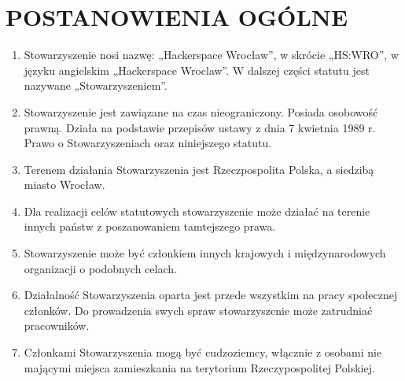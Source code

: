 \documentclass{article}
\begin{document}
\section{POSTANOWIENIA OGÓLNE}
  \begin{enumerate}
    \item Stowarzyszenie nosi nazwę: „Hackerspace Wrocław”, w skrócie „HS:WRO”, w języku angielskim „Hackerspace Wroclaw”. W dalszej części statutu jest nazywane „Stowarzyszeniem”.
    \item Stowarzyszenie jest zawiązane na czas nieograniczony. Posiada osobowość prawną. Działa na podstawie przepisów ustawy z dnia 7 kwietnia 1989 r. Prawo o Stowarzyszeniach oraz niniejszego statutu.
    \item Terenem działania Stowarzyszenia jest Rzeczpospolita Polska, a siedzibą miasto Wrocław.
    \item Dla realizacji celów statutowych stowarzyszenie może działać na terenie innych państw z poszanowaniem tamtejszego prawa.
    \item Stowarzyszenie może być członkiem innych krajowych i międzynarodowych organizacji o podobnych celach.
    \item Działalność Stowarzyszenia oparta jest przede wszystkim na pracy społecznej członków. Do prowadzenia swych spraw stowarzyszenie może zatrudniać pracowników.
    \item Członkami Stowarzyszenia mogą być cudzoziemcy, włącznie z osobami nie mającymi miejsca zamieszkania na terytorium Rzeczypospolitej Polskiej.
  \end{enumerate}
\end{document}
